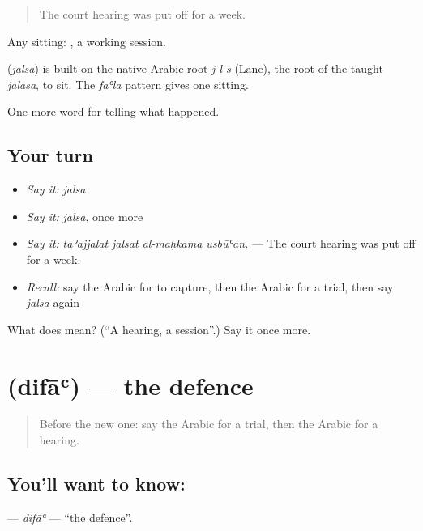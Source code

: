 \begin{quote}
The court hearing was put off for a week.
\end{quote}

Any sitting:  , a working session.

\begin{cousinweb}
\textbf{} (\emph{jalsa}) is built on the native Arabic root \emph{j-l-s} (Lane), the root of the taught \emph{jalasa}, to sit. The \emph{faʿla} pattern gives one sitting.
\end{cousinweb}

\begin{grammarlens}[title={What you've built}]
One more word for telling what happened.
\end{grammarlens}

\subsection*{Your turn}
\begin{itemize}
\raggedright
  \item \emph{Say it:} \emph{jalsa}
  \item \emph{Say it:} \emph{jalsa}, once more
  \item \emph{Say it:} \emph{taʾajjalat jalsat al-maḥkama usbūʿan.} — The court hearing was put off for a week.
  \item \emph{Recall:} say the Arabic for to capture, then the Arabic for a trial, then say \emph{jalsa} again
\end{itemize}

\begin{tcolorbox}[breakable,colback=teal!4,colframe=teal!35!black,title={Before you move on}]
What does  mean? (\textquotedblleft{}A hearing, a session\textquotedblright{}.) Say it once more.
\end{tcolorbox}
\section[\texorpdfstring{\ar{دفاع} (difāʿ)}{دفاع (difāʿ)}]{ (difāʿ) — the defence}

\label{lesson:AR-C334-difa}



\begin{quote}
Before the new one: say the Arabic for a trial, then the Arabic for a hearing.
\end{quote}

\subsection*{You'll want to know: }
\textbf{} — \emph{difāʿ} — \textquotedblleft{}the defence\textquotedblright{}.

